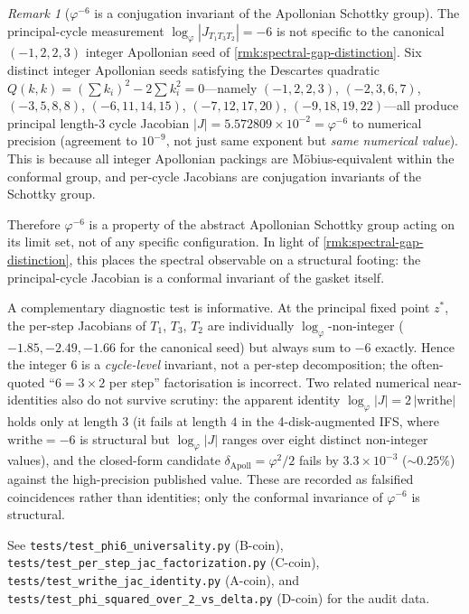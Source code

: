 \documentclass[11pt,a4paper]{article}
\theoremstyle{plain}
\theoremstyle{definition}
\theoremstyle{remark}
\newtheorem{remark}[theorem]{Remark}
\numberwithin{equation}{section}
\begin{document}
\begin{remark}[\(\varphi^{-6}\) is a conjugation invariant of the Apollonian Schottky group]
\label{rmk:phi6-conjugation-invariant}
The principal-cycle measurement
\(\log_\varphi|J_{T_1T_3T_2}|=-6\)
is not specific to the canonical \((-1,2,2,3)\) integer Apollonian
seed of \cref{rmk:spectral-gap-distinction}.  Six distinct integer
Apollonian seeds satisfying the Descartes quadratic
\(Q(k,k)=(\sum k_i)^2-2\sum k_i^2=0\)---namely
\((-1,2,2,3)\), \((-2,3,6,7)\), \((-3,5,8,8)\), \((-6,11,14,15)\),
\((-7,12,17,20)\), \((-9,18,19,22)\)---all produce principal
length-3 cycle Jacobian \(\big|J\big|=5.572809\!\times\!10^{-2}=
\varphi^{-6}\) to numerical precision (agreement to \(10^{-9}\),
not just same exponent but \emph{same numerical value}).  This is
because all integer Apollonian packings are M\"obius-equivalent
within the conformal group, and per-cycle Jacobians are
conjugation invariants of the Schottky group.

Therefore \(\varphi^{-6}\) is a property of the abstract Apollonian
Schottky group acting on its limit set, not of any specific
configuration.  In light of \cref{rmk:spectral-gap-distinction},
this places the spectral observable on a structural footing: the
principal-cycle Jacobian is a conformal invariant of the gasket
itself.

A complementary diagnostic test is informative.  At the principal
fixed point \(z^\ast\), the per-step Jacobians of \(T_1\), \(T_3\),
\(T_2\) are individually \(\log_\varphi\)-non-integer
(\(-1.85,-2.49,-1.66\) for the canonical seed) but always sum to
\(-6\) exactly.  Hence the integer \(6\) is a \emph{cycle-level}
invariant, not a per-step decomposition; the often-quoted
``\(6=3\times 2\) per step'' factorisation is incorrect.  Two
related numerical near-identities also do not survive scrutiny:
the apparent identity \(\log_\varphi|J|=2\,|\mathrm{writhe}|\) holds
only at length \(3\) (it fails at length \(4\) in the
4-disk-augmented IFS, where \(\mathrm{writhe}=-6\) is structural but
\(\log_\varphi|J|\) ranges over eight distinct non-integer values),
and the closed-form candidate \(\delta_{\mathrm{Apoll}}=\varphi^2/2\)
fails by \(3.3\!\times\!10^{-3}\) (\(\sim 0.25\%\)) against the
high-precision published value.  These are recorded as falsified
coincidences rather than identities; only the conformal invariance
of \(\varphi^{-6}\) is structural.

\begin{sloppypar}
See \texttt{tests/}\allowbreak\texttt{test\_phi6\_universality.py} (B-coin),
\texttt{tests/}\allowbreak\texttt{test\_per\_step\_jac\_factorization.py} (C-coin),
\texttt{tests/}\allowbreak\texttt{test\_writhe\_jac\_identity.py} (A-coin), and
\texttt{tests/}\allowbreak\texttt{test\_phi\_squared\_over\_2\_vs\_delta.py} (D-coin)
for the audit data.
\end{sloppypar}
\end{remark}
\end{document}
